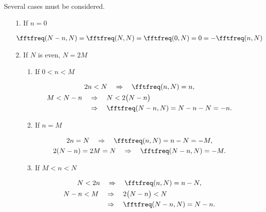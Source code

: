 \documentclass[oneside]{memoir}
\begin{document}
Several cases must be considered.



\begin{itemize}
\item[1. ] If \(n=0\)

\begin{equation*}
\begin{split}\fftfreq(N-n, N)=\fftfreq(N, N)=\fftfreq(0, N)=0=-\fftfreq(n, N)\end{split}\end{equation*}

\item[2. ] If \(N\) is even, \(N=2M\)

\begin{itemize}
\item[1. ] If \(0<n<M\)

\begin{equation*}
\begin{split}\begin{gather*}
2n<N\quad\Rightarrow\quad \fftfreq(n, N)=n,\\
\begin{aligned}
M<N-n&\quad\Rightarrow\quad N<2\bigl(N-n\bigr)\\
&\quad\Rightarrow\quad \fftfreq(N-n, N)=N-n-N=-n.
\end{aligned}
\end{gather*}\end{split}\end{equation*}

\item[2. ] If \(n=M\)

\begin{equation*}
\begin{split}\begin{gather*}
2n=N\quad\Rightarrow\quad \fftfreq(n, N)=n-N=-M,\\
2(N-n)=2M=N\quad\Rightarrow\quad \fftfreq(N-n, N)=-M.
\end{gather*}\end{split}\end{equation*}

\item[3. ] If \(M<n<N\)

\begin{equation*}
\begin{split}\begin{gather*}
N<2n\quad\Rightarrow\quad \fftfreq(n, N)=n-N,\\
\begin{aligned}
N-n<M&\quad\Rightarrow\quad 2\bigl(N-n\bigr)<N\\
&\quad\Rightarrow\quad \fftfreq(N-n, N)=N-n.
\end{aligned}
\end{gather*}\end{split}\end{equation*}
\end{itemize}


\end{itemize}
\end{document}
